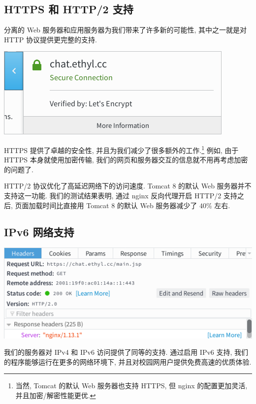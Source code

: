 \documentclass[a4paper,10pt]{article}
\begin{document}
\subsection{HTTPS 和 HTTP/2 支持}

分离的 Web 服务器和应用服务器为我们带来了许多新的可能性, 其中之一就是对 HTTP 协议提供更完整的支持.

\begin{center}
	\includegraphics[scale=0.6]{https.png}
\end{center}

HTTPS 提供了卓越的安全性, 并且为我们减少了很多额外的工作.\footnote{当然, Tomcat 的默认 Web 服务器也支持 HTTPS, 但 nginx 的配置更加灵活, 并且加密/解密性能更优.} 例如, 由于 HTTPS 本身就使用加密传输, 我们的网页和服务器交互的信息就不用再考虑加密的问题了.

HTTP/2 协议优化了高延迟网络下的访问速度. Tomcat 8 的默认 Web 服务器并不支持这一功能. 我们的测试结果表明, 通过 nginx 反向代理开启 HTTP/2 支持之后, 页面加载时间比直接用 Tomcat 8 的默认 Web 服务器减少了 $40\%$ 左右.

\subsection{IPv6 网络支持}

\begin{center}
	\includegraphics[scale=0.6]{h2+ipv6.png}
\end{center}

我们的服务器对 IPv4 和 IPv6 访问提供了同等的支持. 通过启用 IPv6 支持, 我们的程序能够运行在更多的网络环境下, 并且对校园网用户提供免费高速的优质体验.
\end{document}
